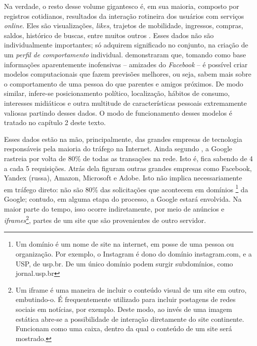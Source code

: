Na verdade, o resto desse volume gigantesco é, em sua maioria, composto por registros cotidianos, resultados da interação rotineira dos usuários com serviços \textit{online}.
Eles são visualizações, \textit{likes}, trajetos de mobilidade, ingressos, compras, saldos, histórico de buscas, entre muitos outros \cite{cyphers_oneway_2019}.
Esses dados não são individualmente importantes; só adquirem significado no conjunto, na criação de um \textit{perfil de comportamento} individual.
\textcite{youyou_computerbased_2015} demonstraram que, tomando como base informações aparentemente inofensivas -- amizades do \textit{Facebook} -- é possível criar modelos computacionais que fazem previsões melhores, ou seja, sabem mais sobre o comportamento de uma pessoa do que parentes e amigos próximos.
De modo similar, infere-se posicionamento político, localização, hábitos de consumo, interesses midiáticos e outra multitude de características pessoais extremamente valiosas partindo desses dados.
O modo de funcionamento desses modelos é tratado no capítulo 2 deste texto.

Esses dados estão na mão, principalmente, das grandes empresas de tecnologia responsáveis pela maioria do tráfego na Internet.
Ainda segundo \textcite[p.~23]{cyphers_oneway_2019}, a Google rastreia por volta de 80\% de todas as transações na rede. 
Isto é, fica sabendo de 4 a cada 5 requisições. Atrás dela figuram outras grandes empresas como Facebook, Yandex (russa), Amazon, Microsoft e Adobe. 
Isto não implica necessariamente em tráfego direto: não são 80\% das solicitações que acontecem em domínios
\footnote{Um domínio é um nome de site na internet, em posse de uma pessoa ou organização. Por exemplo, o Instagram é dono do domínio instagram.com, e a USP, de usp.br. De um único domínio podem surgir subdomínios, como jornal.usp.br} da Google; contudo, em alguma etapa do processo, a Google estará envolvida.
Na maior parte do tempo, isso ocorre indiretamente, por meio de anúncios e \textit{iframes}\footnote{Um iframe é uma maneira de incluir o conteúdo visual de um site em outro, embutindo-o. É frequentemente utilizado para incluir postagens de redes sociais em notícias, por exemplo. Deste modo, ao invés de uma imagem estática abre-se a possibilidade de interação diretamente do site continente. Funcionam como uma caixa, dentro da qual o conteúdo de um site será mostrado.}, partes de um site que são provenientes de outro servidor.

